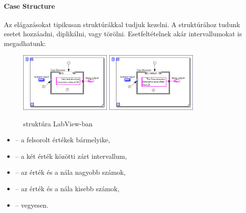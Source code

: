\documentclass[../../main.tex]{subfiles}
\begin{document}
\paragraph*{Case Structure}
Az elágazásokat tipikusan  struktúrákkal tudjuk kezelni.
A struktúrához tudunk esetet hozzáadni, diplikálni, vagy törölni.
Esetfeltételnek akár intervallumokat is megadhatunk:
\begin{figure}[htb]
  \centering
  \hfill
  \includegraphics[height=3cm]{../../static/lw/case1.jpeg}
  \hfill
  \includegraphics[height=3cm]{../../static/lw/case2.jpeg}
  \hfill
  \caption{ struktúra LabView-ban}
  \label{fig:lw/case}
\end{figure}
\begin{itemize}
  \item {} -- a felsorolt értékek bármelyike,
  \item {} -- a két érték közötti zárt intervallum,
  \item {} -- az érték és a nála nagyobb számok,
  \item {} -- az érték és a nála kisebb számok,
  \item {} -- vegyesen.
\end{itemize}
\end{document}
